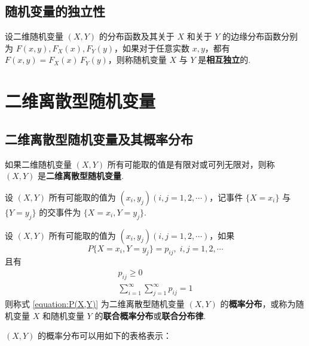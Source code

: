 \subsection{随机变量的独立性}

\begin{definition}
    设二维随机变量 $(X,Y)$ 的分布函数及其关于 $X$ 和关于 $Y$ 的边缘分布函数分别为 $F(x,y), F_{X}(x), F_{Y}(y)$，如果对于任意实数 $x,y$，都有 $F(x,y)=F_{X}(x)\,F_{Y}(y)$，则称随机变量 $X$ 与 $Y$ 是\textbf{相互独立}的.
\end{definition}

\section{二维离散型随机变量}

\subsection{二维离散型随机变量及其概率分布}

\begin{definition}
    如果二维随机变量 $(X,Y)$ 所有可能取的值是有限对或可列无限对，则称 $(X,Y)$ 是\textbf{二维离散型随机变量}.
\end{definition}

设 $(X,Y)$ 所有可能取的值为 $(x_i,y_j)(i,j=1,2,\cdots)$，记事件 $\{X=x_i\}$ 与 $\{Y=y_j\}$ 的交事件为 $\{X=x_i, Y=y_j\}$.

\begin{definition}
    设 $(X,Y)$ 所有可能取的值为 $(x_i,y_j)(i,j=1,2,\cdots)$，如果
    \begin{equation} \label{equation:P(X,Y)}
        P\{X=x_i, Y=y_j\} = p_{ij}, \; i,j=1,2,\cdots
    \end{equation}
    且有
    \begin{gather*}
        p_{ij} \geqslant 0 \\
        \sum_{i=1}^\infty \sum_{j=1}^\infty p_{ij} = 1
    \end{gather*}
    则称式 \eqref{equation:P(X,Y)} 为二维离散型随机变量 $(X,Y)$ 的\textbf{概率分布}，或称为随机变量 $X$ 和随机变量 $Y$ 的\textbf{联合概率分布}或\textbf{联合分布律}.
\end{definition}

$(X,Y)$ 的概率分布可以用如下的表格表示：

